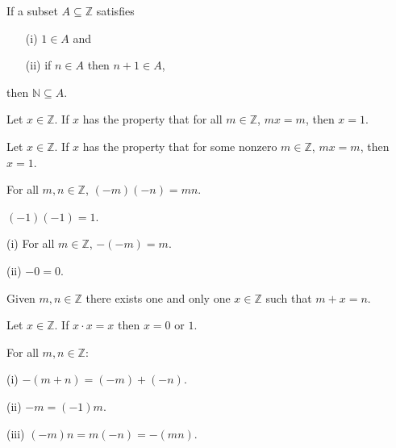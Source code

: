 \documentclass[12pt]{article}
\newenvironment{customprop}[1]{
  \renewcommand\theproposition{#1}
  \proposition
}{\endproposition}
\newenvironment{customaxiom}[1]{
  \renewcommand\theaxiom{#1}
  \axiom
}{\endaxiom}
\begin{document}
\begin{customaxiom}{2.15 (Induction Axiom)}
  If a subset \( A \subseteq \mathbb{Z} \) satisfies
  \begin{enumerate}
    \item[(i)] \( 1 \in A \) and
    \item[(ii)] if \( n \in A \) then \( n + 1 \in A \),
  \end{enumerate}
  then \( \mathbb{N} \subseteq A \).
\end{customaxiom}


\begin{customprop}{1.18}
  Let $x \in \mathbb{Z}$. If $x$ has the property that for all $m \in \mathbb{Z}$, $mx = m$, then $x = 1$.
\end{customprop}

\begin{customprop}{1.19}
  Let $x \in \mathbb{Z}$. If $x$ has the property that for some nonzero $m \in \mathbb{Z}$, $mx = m$, then $x = 1$.
\end{customprop}

\begin{customprop}{1.20}
  For all $m, n \in \mathbb{Z}$, $(-m)(-n) = mn$.
\end{customprop}

\begin{customprop}{1.21}
  $(-1)(-1) = 1$.
\end{customprop}

\begin{customprop}{1.22}
  \item[(i)] For all $m \in \mathbb{Z}$, $-(-m) = m$.
  \item[(ii)] $-0 = 0$.
\end{customprop}

\begin{customprop}{1.23}
  Given $m, n \in \mathbb{Z}$ there exists one and only one $x \in \mathbb{Z}$ such that $m + x = n$.
\end{customprop}

\begin{customprop}{1.24}
  Let $x \in \mathbb{Z}$. If $x \cdot x = x$ then $x = 0$ or $1$.
\end{customprop}

\begin{customprop}{1.25}
  For all $m, n \in \mathbb{Z}$:
  \item[(i)] $-(m + n) = (-m) + (-n)$.
  \item[(ii)] $-m = (-1)m$.
  \item[(iii)] $(-m)n = m(-n) = -(mn)$.
\end{customprop}
\end{document}
